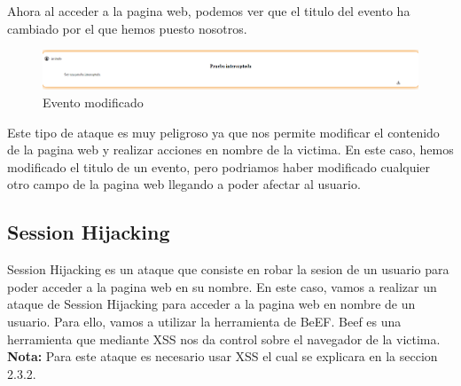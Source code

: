 \documentclass{report}
\begin{document}
                Ahora al acceder a la pagina web, podemos ver que el titulo del evento ha cambiado por el que hemos puesto nosotros.
                \begin{figure}[H]
                    \centering
                    \includegraphics[width=1\textwidth]{./img/vulnerabilidades/2.2/2.5.png}
                    \caption{Evento modificado}
                \end{figure}
                Este tipo de ataque es muy peligroso ya que nos permite modificar el contenido de la pagina web y realizar acciones en nombre de la victima.
                En este caso, hemos modificado el titulo de un evento, pero podriamos haber modificado cualquier otro campo de la pagina web llegando a poder afectar al usuario.
                \clearpage
            \subsection{Session Hijacking}
                Session Hijacking es un ataque que consiste en robar la sesion de un usuario para poder acceder a la pagina web en su nombre.
                En este caso, vamos a realizar un ataque de Session Hijacking para acceder a la pagina web en nombre de un usuario.
                Para ello, vamos a utilizar la herramienta de BeEF.
                Beef es una herramienta que mediante XSS nos da control sobre el navegador de la victima.\\

                \textbf{Nota:} Para este ataque es necesario usar XSS el cual se explicara en la seccion 2.3.2.\\
\end{document}
